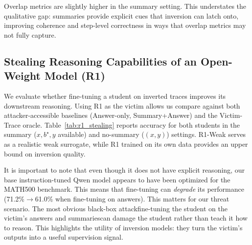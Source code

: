 \documentclass{article}
\newcommand\shortsection[1]{\vspace{.75ex}{\noindent\bf #1.}}
\begin{document}
\shortsection{Summary vs.\ no-summary} Overlap metrics are slightly higher in the summary setting. This understates the qualitative gap: summaries provide explicit cues that inversion can latch onto, improving coherence and step-level correctness in ways that overlap metrics may not fully capture.


\subsection{Stealing Reasoning Capabilities of an Open-Weight Model (R1)}
\label{sec:eval-r1-stealing}

We evaluate whether fine-tuning a student on inverted traces improves its downstream reasoning. Using R1 as the victim allows us compare against both attacker-accessible baselines (Answer-only, Summary+Answer) and the Victim-Trace oracle. Table~\ref{tab:r1_stealing} reports accuracy for both students in the summary ($x,b^\star,y$ available) and no-summary ($(x,y)$) settings.  R1-Weak serves as a realistic weak surrogate, while R1 trained on its own data provides an upper bound on inversion quality.

It is important to note that even though it does not have explicit reasoning, our base instruction-tuned Qwen model appears to have been optimized for the MATH500 benchmark.  This means that fine-tuning can \emph{degrade} its performance (71.2\%$\rightarrow$61.0\% when fine-tuning on answers).  This matters for our threat scenario.  The most obvious black-box attack\textemdash fine-tuning the student on the victim's answers and summaries\textemdash can damage the student rather than teach it how to reason.  This highlights the utility of inversion models: they turn the victim's outputs into a useful supervision signal.
\end{document}
